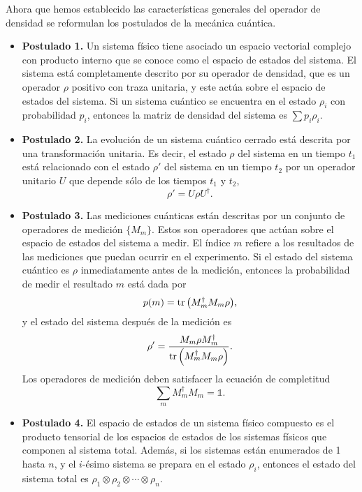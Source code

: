 Ahora que hemos establecido las características generales del 
operador de densidad se reformulan los postulados de la mecánica
cuántica.
\begin{itemize}
	\item[] \textbf{Postulado 1.} Un sistema físico tiene asociado un espacio vectorial complejo
	con producto interno que se conoce como el espacio de estados del
	sistema. El sistema está completamente descrito por su operador de densidad,
	que es un operador $\rho$ positivo con traza unitaria, y este actúa sobre 
	el espacio de estados del sistema. Si un sistema cuántico se encuentra
	en el estado $\rho _i$ con probabilidad $p_i$, entonces la matriz de
	densidad del sistema es $\sum p_i\rho_i$.
	\item[] \textbf{Postulado 2.} La evolución de un sistema cuántico cerrado está descrita por una transformación
	unitaria. Es decir, el estado $\rho$ del sistema en un tiempo $t_1$ está 
	relacionado con el estado $\rho'$ del sistema en un tiempo $t_2$ por un operador
	unitario $U$ que depende sólo de los tiempos $t_1$ y $t_2$,
	\begin{equation}
	\rho'=U\rho U^{\dagger}.
	\label{eq:postulate1}
	\end{equation}
	\item[] \textbf{Postulado 3.} Las mediciones cuánticas están descritas por un conjunto de 
	operadores de medición $\{M_m\}$. Estos son operadores que actúan sobre el espacio 
	de estados del sistema a medir. El índice $m$ refiere a los resultados
	de las mediciones que puedan ocurrir en el experimento. Si el estado del sistema
	cuántico es $\rho$ inmediatamente antes de la medición, entonces la probabilidad
	de medir el resultado $m$ está dada por
	\begin{equation}
	p(m)=\tr \qty(M_m^{\dagger}M_m\rho),
	\label{eq:postulate2_prob}
	\end{equation}						
	y el estado del sistema después de la medición es
	\begin{equation}
	\rho'=\frac{M_m\rho M_m^{\dagger}}{\tr \qty(M_m^{\dagger}M_m\rho)}.
	\label{eq:postulate2_rhoPrime}
	\end{equation}	
	Los operadores de medición deben satisfacer la ecuación de completitud
	\begin{equation}
	\sum _m M_m^{\dagger}M_m=\mathbb{1}.
	\label{eq:postulate2_completeness}
	\end{equation}
	\item[] \textbf{Postulado 4.} El espacio de estados de un sistema físico compuesto es el producto tensorial 
	de los espacios de estados de los sistemas físicos que componen al sistema total.
	Además, si los sistemas están enumerados de 1 hasta $n$, y el $i$-ésimo sistema
	se prepara en el estado $\rho_i$, entonces el estado del sistema total es
	$\rho_1\otimes\rho_2\otimes\cdots\otimes\rho_n$.
\end{itemize}

